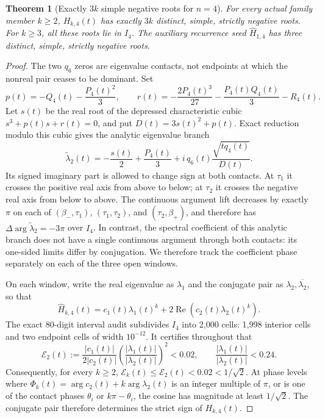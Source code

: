 \documentclass[11pt,a4paper]{article}
\newtheorem{theorem}{Theorem}[section]
\theoremstyle{definition}
\begin{document}
\begin{theorem}[Exactly $3k$ simple negative roots for $n=4$]
\label{thm:n4-real-rooted}
For every actual family member $k\ge2$, $H_{k,4}(t)$ has exactly
$3k$ distinct, simple, strictly negative roots. For $k\ge3$, all
these roots lie in $I_4$. The auxiliary recurrence seed
$\widehat H_{1,4}$ has three distinct, simple, strictly negative roots.
\end{theorem}

\begin{proof}
The two $q_6$ zeros are eigenvalue contacts, not endpoints at which the
nonreal pair ceases to be dominant. Set
\[
p(t)=-Q_4(t)-\frac{P_4(t)^2}{3},\qquad
r(t)=-\frac{2P_4(t)^3}{27}-\frac{P_4(t)Q_4(t)}3-R_4(t).
\]
Let $s(t)$ be the real root of the depressed characteristic cubic
$s^3+p(t)s+r(t)=0$, and put
$D(t)=3s(t)^2+p(t)$. Exact reduction modulo this cubic gives the
analytic eigenvalue branch
\[
\widetilde\lambda_2(t)
=-\frac{s(t)}2+\frac{P_4(t)}3
+i\,q_6(t)\frac{\sqrt{tq_4(t)}}{D(t)}.
\]
Its signed imaginary part is allowed to change sign at both contacts.
At $\tau_1$ it crosses the positive real axis from above to below; at
$\tau_2$ it crosses the negative real axis from below to above. The
continuous argument lift decreases by exactly $\pi$ on each of
$(\beta_-,\tau_1)$, $(\tau_1,\tau_2)$, and $(\tau_2,\beta_+)$, and
therefore has
$\Delta\arg\widetilde\lambda_2=-3\pi$ over $I_4$. In contrast, the
spectral coefficient of this analytic branch does not have a single
continuous argument through both contacts: its one-sided limits differ
by conjugation. We therefore track the coefficient phase separately on
each of the three open windows.

On each window, write the real eigenvalue as $\lambda_1$ and the
conjugate pair as $\lambda_2,\overline{\lambda_2}$, so that
\[
\widehat H_{k,4}(t)=c_1(t)\lambda_1(t)^k
+2\operatorname{Re}\!\left(c_2(t)\lambda_2(t)^k\right).
\]
The exact 80-digit interval audit subdivides $I_4$ into 2,000 cells:
1,998 interior cells and two endpoint cells of width $10^{-12}$. It
certifies throughout that
\[
\mathcal E_2(t):=
\frac{|c_1(t)|}{2|c_2(t)|}
\left(\frac{|\lambda_1(t)|}{|\lambda_2(t)|}\right)^2<0.02,
\qquad
\frac{|\lambda_1(t)|}{|\lambda_2(t)|}<0.24.
\]
Consequently, for every $k\ge2$,
$\mathcal E_k(t)\le\mathcal E_2(t)<0.02<1/\sqrt2$.
At phase levels where
$\Phi_k(t)=\arg c_2(t)+k\arg\lambda_2(t)$ is an integer multiple of
$\pi$, or is one of the contact phases $\theta_i$ or $k\pi-\theta_i$,
the cosine has magnitude at least $1/\sqrt2$. The conjugate pair
therefore determines the strict sign of $H_{k,4}(t)$.


\end{proof}
\end{document}
